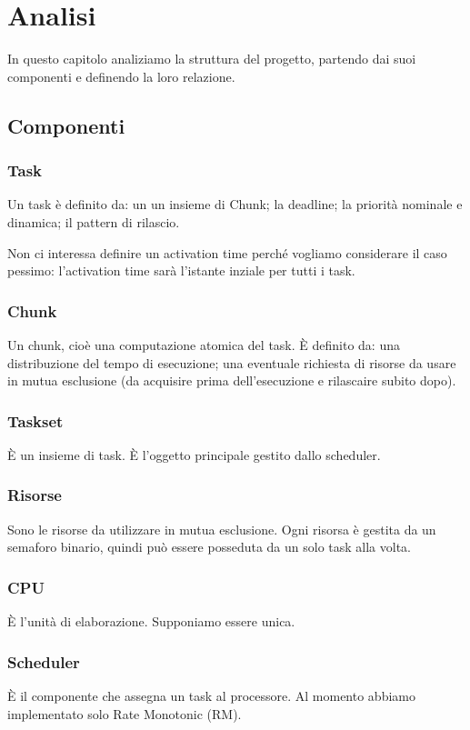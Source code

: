 \chapter{Analisi}
In questo capitolo analiziamo la struttura del progetto, partendo dai suoi componenti e definendo la loro relazione.

\section{Componenti}

\subsection{Task}
Un task è definito da: un un insieme di Chunk; la deadline; la priorità nominale e dinamica; il pattern di rilascio.

Non ci interessa definire un activation time perché vogliamo considerare il caso pessimo: l'activation time sarà l'istante inziale per tutti i task.

\subsection{Chunk}
Un chunk, cioè una computazione atomica del task. È definito da: una distribuzione del tempo di esecuzione; una eventuale richiesta di risorse da usare in mutua esclusione (da acquisire prima dell'esecuzione e rilascaire subito dopo).

\subsection{Taskset}
È un insieme di task. È l'oggetto principale gestito dallo scheduler.

\subsection{Risorse}
Sono le risorse da utilizzare in mutua esclusione. Ogni risorsa è gestita da un semaforo binario, quindi può essere posseduta da un solo task alla volta.

\subsection{CPU}
È l'unità di elaborazione. Supponiamo essere unica.

\subsection{Scheduler}
È il componente che assegna un task al processore. Al momento abbiamo implementato solo Rate Monotonic (RM).

